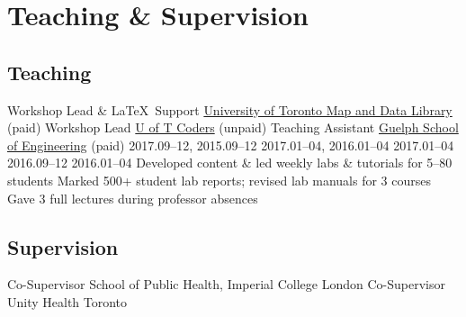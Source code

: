 \section{Teaching \& Supervision}\twodate
\subsection{Teaching}
  {Workshop Lead \& \LaTeX\ Support}
  {\href{https://mdl.library.utoronto.ca}{University of Toronto Map and Data Library} (paid)}
  {Workshop Lead}
  {\href{https://uoftcoders.github.io}{U of T Coders} (unpaid)}
  {Teaching Assistant}
  {\href{https://www.uoguelph.ca/engineering}{Guelph School of Engineering} (paid)}
     {2017.09--12, 2015.09--12}
       {2017.01--04, 2016.01--04}
     {2017.01--04}
              {2016.09--12}
   {2016.01--04}
  \bullet Developed content \& led weekly labs \& tutorials for 5--80 students
  \bullet Marked 500+ student lab reports; revised lab manuals for 3 courses
  \bullet Gave 3 full lectures during professor absences
\clearpage %
\subsection{Supervision}
  {Co-Supervisor} %
  {School of Public Health, Imperial College London}
  {Co-Supervisor} %
  {Unity Health Toronto}
\vspace{1em} %
